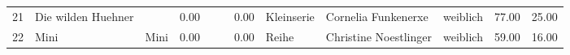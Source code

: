 \begin{table}
\begin{center}
{\begin{tabular}{rllrllrlllrr}
  21 & Die wilden Huehner                                                                                                                                                                                                                                              &                                                                                                                                                                                                                                                                 & 0.00 &                                                                                                                                                                                                                                                                 &                                                                                                                                                                                                                                                                 & 0.00 & Kleinserie & Cornelia Funkenerxe                                                                                                                                                                                                                                             & weiblich & 77.00 & 25.00 \\ 
  22 & Mini                                                                                                                                                                                                                                                            & Mini                                                                                                                                                                                                                                                            & 0.00 &                                                                                                                                                                                                                                                                 &                                                                                                                                                                                                                                                                 & 0.00 & Reihe & Christine Noestlinger                                                                                                                                                                                                                                           & weiblich & 59.00 & 16.00 \\ 

\end{tabular}}
\end{center}
\end{table}
